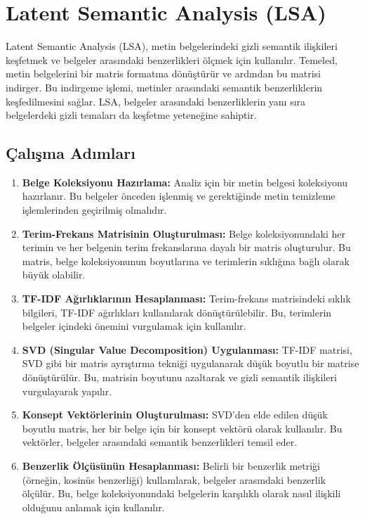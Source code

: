 \section{Latent Semantic Analysis (LSA)}
Latent Semantic Analysis (LSA), metin belgelerindeki gizli semantik ilişkileri keşfetmek ve belgeler arasındaki benzerlikleri ölçmek için kullanılır. Temeled, metin belgelerini bir matris formatına dönüştürür ve ardından bu matrisi indirger. Bu indirgeme işlemi, metinler arasındaki semantik benzerliklerin keşfedilmesini sağlar. LSA, belgeler arasındaki benzerliklerin yanı sıra belgelerdeki gizli temaları da keşfetme yeteneğine sahiptir.

\subsection{Çalışma Adımları}
\begin{enumerate}
    \item \textbf{Belge Koleksiyonu Hazırlama:} Analiz için bir metin belgesi koleksiyonu hazırlanır. Bu belgeler önceden işlenmiş ve gerektiğinde metin temizleme işlemlerinden geçirilmiş olmalıdır.
    \item \textbf{Terim-Frekans Matrisinin Oluşturulması:} Belge koleksiyonundaki her terimin ve her belgenin terim frekanslarına dayalı bir matris oluşturulur. Bu matris, belge koleksiyonunun boyutlarına ve terimlerin sıklığına bağlı olarak büyük olabilir.
    \item \textbf{TF-IDF Ağırlıklarının Hesaplanması:} Terim-frekans matrisindeki sıklık bilgileri, TF-IDF ağırlıkları kullanılarak dönüştürülebilir. Bu, terimlerin belgeler içindeki önemini vurgulamak için kullanılır. 
    \item \textbf{SVD (Singular Value Decomposition) Uygulanması:} TF-IDF matrisi, SVD gibi bir matris ayrıştırma tekniği uygulanarak düşük boyutlu bir matrise dönüştürülür. Bu, matrisin boyutunu azaltarak ve gizli semantik ilişkileri vurgulayarak yapılır.
    \item \textbf{Konsept Vektörlerinin Oluşturulması:} SVD'den elde edilen düşük boyutlu matris, her bir belge için bir konsept vektörü olarak kullanılır. Bu vektörler, belgeler arasındaki semantik benzerlikleri temsil eder.
    \item \textbf{Benzerlik Ölçüsünün Hesaplanması:} Belirli bir benzerlik metriği (örneğin, kosinüs benzerliği) kullanılarak, belgeler arasındaki benzerlik ölçülür. Bu, belge koleksiyonundaki belgelerin karşılıklı olarak nasıl ilişkili olduğunu anlamak için kullanılır.
\end{enumerate}

